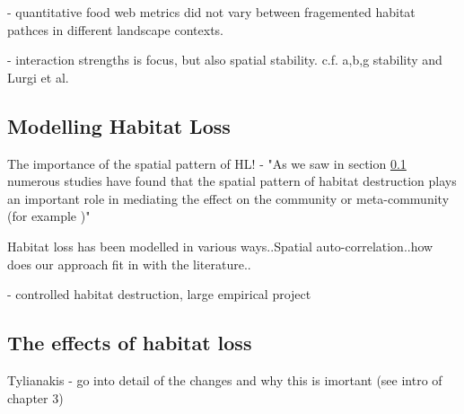 \cite{kaartinen2011shrinking} - quantitative food web metrics did not vary between fragemented habitat pathces in different landscape contexts.

\cite{o2009perturbations} - interaction strengths is focus, but also spatial stability. c.f. a,b,g stability and Lurgi et al.

\subsection{Modelling Habitat Loss}
\label{sec:intro_modelling_HL}

The importance of the spatial pattern of HL! - "As we saw in section \ref{sec:intro_modelling_HL} numerous studies have found that the spatial pattern of habitat destruction plays an important role in mediating the effect on the community or meta-community (for example \cite{ovaskainen2002metapopulation,jager2006simulated,sole2006self})"

Habitat loss has been modelled in various ways..Spatial auto-correlation..how does our approach fit in with the literature..

\cite{ewers2011large} - controlled habitat destruction, large empirical project

\subsection{The effects of habitat loss}
\label{sec:intro_HL_effects}

Tylianakis - go into detail of the changes and why this is imortant (see intro of chapter 3)
